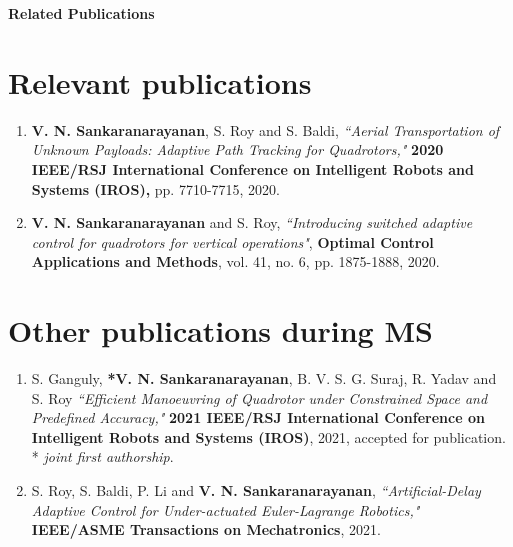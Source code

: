 \begin{center}
    
{{\Large{\textbf{Related Publications}}}}

\end{center}
\vspace{1cm}

\section*{{\textbf{\Large{Relevant publications}}}}
\begin{enumerate}
    \item  \textbf{V. N. Sankaranarayanan}, S. Roy and S. Baldi, \textit{``Aerial Transportation of Unknown Payloads: Adaptive Path Tracking for Quadrotors,"} \textbf{2020 IEEE/RSJ International Conference on Intelligent Robots and Systems (IROS),} pp. 7710-7715, 2020. 
    \item  \textbf{V. N. Sankaranarayanan} and S. Roy, \textit{``Introducing switched adaptive control for quadrotors for vertical operations"}, \textbf{Optimal Control Applications and Methods}, vol. 41, no. 6, pp. 1875-1888, 2020. %
\end{enumerate}
\vspace{.3cm}
\section*{{\textbf{\Large{Other publications during MS}}}}
\begin{enumerate}
    \item S. Ganguly, \textbf{*V. N. Sankaranarayanan}, B. V. S. G. Suraj, R. Yadav and S. Roy \textit{``Efficient Manoeuvring of Quadrotor under Constrained Space and Predefined Accuracy,"} \textbf{2021 IEEE/RSJ International Conference on Intelligent Robots and Systems (IROS)}, 2021, accepted for publication. \\
    * \textit{joint first authorship}.
    \item S. Roy, S. Baldi, P. Li and \textbf{V. N. Sankaranarayanan}, \textit{``Artificial-Delay Adaptive Control for Under-actuated Euler-Lagrange Robotics,"} \textbf{IEEE/ASME Transactions on Mechatronics}, 2021.
\end{enumerate}


